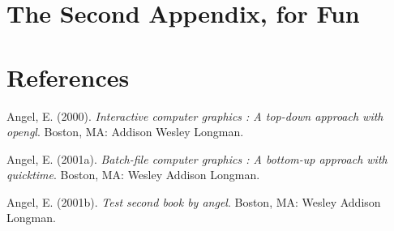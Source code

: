 \documentclass[12pt,twoside]{reedthesis}
\theoremstyle{definition}
\theoremstyle{definition}
\theoremstyle{definition}
\theoremstyle{remark}
\begin{document}
\chapter{The Second Appendix, for
Fun}\label{the-second-appendix-for-fun}

\backmatter

\chapter*{References}\label{references}


\noindent

\setlength{\parindent}{-0.20in} \setlength{\leftskip}{0.20in}
\setlength{\parskip}{8pt}

\hypertarget{refs}{}
\hypertarget{ref-angel2000}{}
Angel, E. (2000). \emph{Interactive computer graphics : A top-down
approach with opengl}. Boston, MA: Addison Wesley Longman.

\hypertarget{ref-angel2001}{}
Angel, E. (2001a). \emph{Batch-file computer graphics : A bottom-up
approach with quicktime}. Boston, MA: Wesley Addison Longman.

\hypertarget{ref-angel2002a}{}
Angel, E. (2001b). \emph{Test second book by angel}. Boston, MA: Wesley
Addison Longman.


\end{document}
